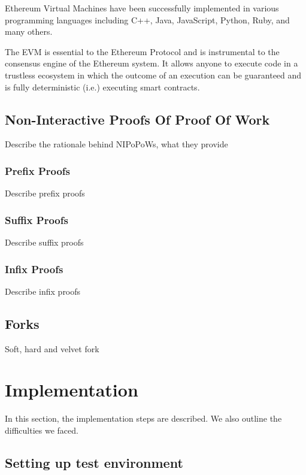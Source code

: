 \documentclass{article}
\begin{document}
  Ethereum Virtual Machines have been successfully implemented in
  various programming languages including C++, Java, JavaScript, Python,
  Ruby, and many others.

  The EVM is essential to the Ethereum Protocol and is instrumental to
  the consensus engine of the Ethereum system. It allows anyone to
  execute code in a trustless ecosystem in which the outcome of an
  execution can be guaranteed and is fully deterministic (i.e.)
  executing smart contracts.

  \subsection{Non-Interactive Proofs Of Proof Of Work}

  Describe the rationale behind NIPoPoWs, what they provide

  \subsubsection{Prefix Proofs}

  Describe prefix proofs

  \subsubsection{Suffix Proofs}

  Describe suffix proofs

  \subsubsection{Infix Proofs}

  Describe infix proofs

  \subsection{Forks}

  Soft, hard and velvet fork

  \section{Implementation}

  In this section, the implementation steps are described. We also
  outline the difficulties we faced.

  \subsection{Setting up test environment}
\end{document}
